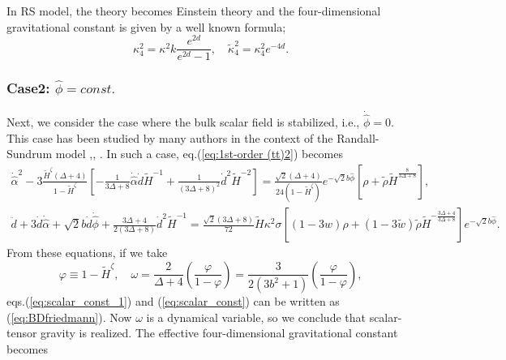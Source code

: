 \documentclass[a4paper,11pt]{article}
\begin{document}
In RS model, the theory becomes Einstein theory and the four-dimensional
gravitational constant is given by a well known formula;
\begin{equation}
\kappa_4^2= \kappa^2 k \frac{e^{2d}}{e^{2d}-1}, \quad \tilde{\kappa}_4^2
=\kappa_4^2 e^{-4d}. 
\end{equation}

\subsubsection{Case2: $\hat{\phi} = const.$}
Next, we consider the case where the bulk scalar field is stabilized, i.e., 
$\dot{\hat{\phi}}=0$.  This case has been studied by many authors 
in the context of the Randall-Sundrum model \cite{Kanno1},\cite{Kanno2},
\cite{GT}. 
In such a case, eq.(\ref{eq:1st-order (tt)2}) becomes
\begin{eqnarray}
\dot{\hat{\alpha}}^2 
-3\frac{\tilde{H}^{\zeta}(\Delta +4)}{1-\tilde{H}^{\zeta}}
\left[
-\frac{1}{3\Delta +8}\dot{\hat{\alpha}}\dot{d}\tilde{H}^{-1}
+\frac{1}{(3\Delta +8)^2}\dot{d}^2 \tilde{H}^{-2}
\right]  
= \frac{\sqrt{2}(\Delta +4)}{24(1-\tilde{H}^{\zeta})}
e^{-\sqrt{2}b\hat{\phi}}
\left[
\rho + \tilde{\rho}\tilde{H}^{\frac{8}{3\Delta +8}}
\right],
\label{eq:scalar_const_1} \\
\ddot{d}+3\dot{d}\dot{\hat{\alpha}}+\sqrt{2}b\dot{d}\dot{\hat{\phi}}
+\frac{3\Delta +4}{2(3\Delta +8)}\dot{d}^2 \tilde{H}^{-1}  
=\frac{\sqrt{2}(3\Delta +8)}{72}\tilde{H} \kappa^2 \sigma
\left[
(1-3w)\rho +(1-3\tilde{w})\tilde{\rho}
\tilde{H}^{-\frac{3\Delta +4}{3\Delta +8}}
\right]e^{-\sqrt{2}b \hat{\phi}}.
\label{eq:scalar_const}
\end{eqnarray}
From these equations, if we take
\begin{equation}
\varphi \equiv 1-\tilde{H}^{\zeta}, \quad
\omega = \frac{2}{\Delta +4} \left( \frac{\varphi}{1-\varphi} \right)
=\frac{3}{2(3 b^2+1)} \left( \frac{\varphi}{1 -\varphi} \right),
\end{equation}
eqs.(\ref{eq:scalar_const_1}) and (\ref{eq:scalar_const}) can be 
written as (\ref{eq:BDfriedmann}).
Now $\omega$ is a dynamical variable, so we conclude that scalar-tensor 
gravity is realized. 
The effective four-dimensional gravitational constant becomes 
\end{document}
